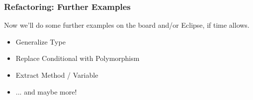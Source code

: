 \begin{frame}
\frametitle{Refactoring: Further Examples}
\begin{changemargin}{1cm}

Now we'll do some further examples on the board and/or Eclipse, if time allows.

\begin{itemize}
	\item Generalize Type
	\item Replace Conditional with Polymorphism
	\item Extract Method / Variable
	\item ... and maybe more!
\end{itemize}

\end{changemargin}
\end{frame}




